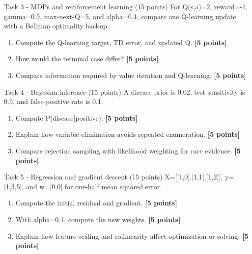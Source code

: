 \documentclass[aspectratio=169,11pt]{beamer}
\begin{document}
\begin{frame}{Task 3 - MDPs and reinforcement learning (15 points)}
\small
For Q(s,a)=2, reward=-1, gamma=0.9, max-next-Q=5, and alpha=0.1, compare one Q-learning update with a Bellman optimality backup.

\vspace{0.2cm}
\begin{enumerate}
\item[\textbf{a.}] Compute the Q-learning target, TD error, and updated Q. \hfill{\color{courseblue}\textbf{[5 points]}}
\item[\textbf{b.}] How would the terminal case differ? \hfill{\color{courseblue}\textbf{[5 points]}}
\item[\textbf{c.}] Compare information required by value iteration and Q-learning. \hfill{\color{courseblue}\textbf{[5 points]}}
\end{enumerate}
\end{frame}

\begin{frame}{Task 4 - Bayesian inference (15 points)}
\small
A disease prior is 0.02, test sensitivity is 0.9, and false-positive rate is 0.1.

\vspace{0.2cm}
\begin{enumerate}
\item[\textbf{a.}] Compute P(disease|positive). \hfill{\color{courseblue}\textbf{[5 points]}}
\item[\textbf{b.}] Explain how variable elimination avoids repeated enumeration. \hfill{\color{courseblue}\textbf{[5 points]}}
\item[\textbf{c.}] Compare rejection sampling with likelihood weighting for rare evidence. \hfill{\color{courseblue}\textbf{[5 points]}}
\end{enumerate}
\end{frame}

\begin{frame}{Task 5 - Regression and gradient descent (15 points)}
\small
X=[[1,0],[1,1],[1,2]], y=[1,3,5], and w=[0,0] for one-half mean squared error.

\vspace{0.2cm}
\begin{enumerate}
\item[\textbf{a.}] Compute the initial residual and gradient. \hfill{\color{courseblue}\textbf{[5 points]}}
\item[\textbf{b.}] With alpha=0.1, compute the new weights. \hfill{\color{courseblue}\textbf{[5 points]}}
\item[\textbf{c.}] Explain how feature scaling and collinearity affect optimization or solving. \hfill{\color{courseblue}\textbf{[5 points]}}
\end{enumerate}
\end{frame}
\end{document}
